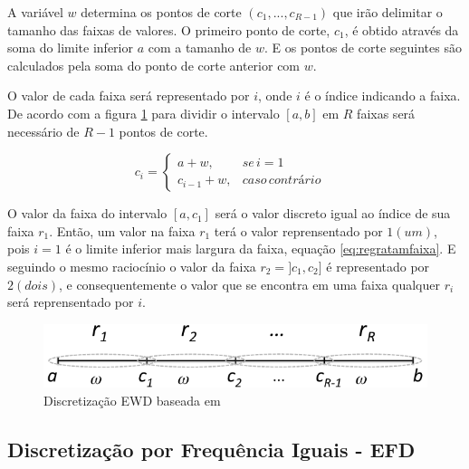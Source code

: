 A variável ${w}$ determina os pontos de corte ${(c_1,...,c_{R-1})}$ que irão delimitar o tamanho das faixas de valores. O primeiro ponto de corte, ${c_1}$, é obtido através da soma do limite inferior ${a}$ com a tamanho de ${w}$. E os pontos de corte seguintes são calculados pela soma do ponto de corte anterior com ${w}$.


O valor de cada faixa será representado por ${i}$, onde ${i}$ é o índice indicando a faixa. De acordo com a figura \ref{fig:faixasEWD} para dividir o intervalo ${[a,b]}$ em ${R}$ faixas será necessário de ${R-1}$ pontos de corte.

\begin{equation}
c_i=\left\{\begin{matrix}
a+w, & se\, i=1 & \\ 
c_{i-1}+w,  & caso\, contrário & 
\end{matrix}\right.
 \label{eq:regratamfaixa}
\end{equation}

O valor da faixa do intervalo ${[a,c_1]}$ será o valor discreto igual ao índice de sua faixa ${r_1}$. Então, um valor na faixa ${r_1}$ terá o valor reprensentado por ${1(um)}$, pois  ${i=1}$ é o limite inferior mais largura da faixa, equação \ref{eq:regratamfaixa}. E seguindo o mesmo raciocínio o valor da faixa ${r_2=]c_1,c_2]}$ é representado por ${2(dois)}$, e consequentemente o valor que se encontra em uma faixa qualquer ${r_i}$ será reprensentado por ${i}$.

\begin{figure}[h] 
        \centering
        \includegraphics[scale=0.6]{figs/discretizacaoEWD.png}
        \caption[Discretização EWD]{Discretização EWD baseada em \cite{LOPES2014}}%
        \label{fig:faixasEWD}
\end{figure}



\subsection{Discretização por Frequência Iguais - EFD}\label{cap:refTeor:subsec:efd}

